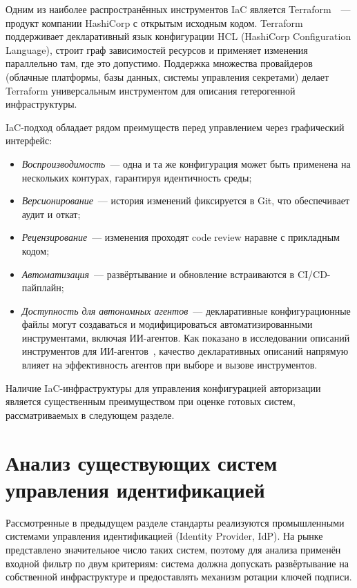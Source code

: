 Одним из наиболее распространённых инструментов IaC является
Terraform~\cite{HashiCorpTerraform}~--- продукт компании HashiCorp
с открытым исходным кодом.
Terraform поддерживает декларативный язык конфигурации HCL
(HashiCorp Configuration Language),
строит граф зависимостей ресурсов
и применяет изменения параллельно там, где это допустимо.
Поддержка множества провайдеров (облачные платформы, базы данных,
системы управления секретами) делает Terraform универсальным инструментом
для описания гетерогенной инфраструктуры.

IaC-подход обладает рядом преимуществ перед управлением через графический интерфейс:
\begin{itemize}
  \item \emph{Воспроизводимость}~--- одна и та же конфигурация
    может быть применена на нескольких контурах,
    гарантируя идентичность среды;
  \item \emph{Версионирование}~--- история изменений
    фиксируется в Git, что обеспечивает аудит и откат;
  \item \emph{Рецензирование}~--- изменения проходят
    code review наравне с прикладным кодом;
  \item \emph{Автоматизация}~--- развёртывание и обновление
    встраиваются в CI/CD-пайплайн;
  \item \emph{Доступность для автономных агентов}~---
    декларативные конфигурационные файлы
    могут создаваться и модифицироваться автоматизированными инструментами,
    включая ИИ-агентов.
    Как показано в исследовании описаний инструментов
    для ИИ-агентов~\cite{Hasan2026MCP},
    качество декларативных описаний
    напрямую влияет на эффективность агентов при выборе и вызове инструментов.
\end{itemize}

Наличие IaC-инфраструктуры для управления конфигурацией авторизации
является существенным преимуществом при оценке готовых систем,
рассматриваемых в следующем разделе.

\section{Анализ существующих систем управления идентификацией}\label{sec:idp-analysis}

Рассмотренные в предыдущем разделе стандарты реализуются промышленными системами
управления идентификацией (Identity Provider, IdP).
На рынке представлено значительное число таких систем,
поэтому для анализа применён входной фильтр по двум критериям:
система должна допускать развёртывание на собственной инфраструктуре
и предоставлять механизм ротации ключей подписи.


